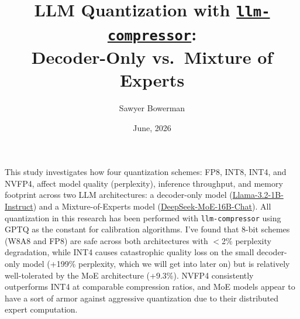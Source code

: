 \documentclass[10pt,twocolumn]{article}
\title{LLM Quantization with \texttt{\href{https://github.com/vllm-project/llm-compressor}{llm-compressor}}:\\Decoder-Only vs.\ Mixture of Experts}
\author{Sawyer Bowerman}
\date{June, 2026}
\begin{document}
\maketitle

\begin{onecolabstract}
This study investigates how four quantization schemes: FP8, INT8, INT4, and NVFP4, affect model quality (perplexity), inference throughput, and memory footprint across two LLM architectures: a decoder-only model (\href{https://huggingface.co/meta-llama/Llama-3.2-1B-Instruct}{Llama-3.2-1B-Instruct}) and a Mixture-of-Experts model (\href{https://huggingface.co/deepseek-ai/deepseek-moe-16b-chat}{DeepSeek-MoE-16B-Chat}). All quantization in this research has been performed with \texttt{llm-compressor} using GPTQ as the constant for calibration algorithms. I've found that 8-bit schemes (W8A8 and FP8) are safe across both architectures with $<$2\% perplexity degradation, while INT4 causes catastrophic quality loss on the small decoder-only model (+199\% perplexity, which we will get into later on) but is relatively well-tolerated by the MoE architecture (+9.3\%). NVFP4 consistently outperforms INT4 at comparable compression ratios, and MoE models appear to have a sort of armor against aggressive quantization due to their distributed expert computation.
\end{onecolabstract}
\end{document}
